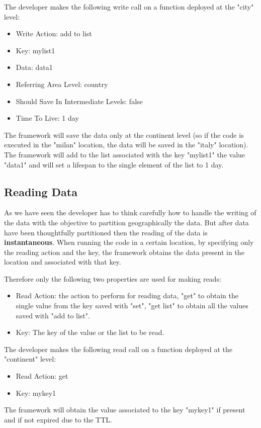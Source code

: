 \begin{example}
The developer makes the following write call on a function deployed at the "city" level:
\begin{itemize}
    \item Write Action: add to list
    \item Key: mylist1
    \item Data: data1
    \item Referring Area Level: country
    \item Should Save In Intermediate Levels: false
    \item Time To Live: 1 day
\end{itemize}
The framework will save the data only at the continent level (so if the code is executed in the "milan" location, the data will be saved in the "italy" location). The framework will add to the list associated with the key "mylist1" the value "data1" and will set a lifespan to the single element of the list to 1 day.
\end{example}


\subsection{Reading Data}
As we have seen the developer has to think carefully how to handle the writing of the data with the objective to partition geographically the data. But after data have been thoughtfully partitioned then the reading of the data is \textbf{instantaneous}.
When running the code in a certain location, by specifying only the reading action and the key, the framework obtains the data present in the location and associated with that key.

Therefore only the following two properties are used for making reads:
\begin{itemize}
    \item Read Action: the action to perform for reading data, "get" to obtain the single value from the key saved with "set", "get list" to obtain all the values saved with "add to list".
    \item Key: The key of the value or the list to be read.
\end{itemize}

\begin{example}
The developer makes the following read call on a function deployed at the "continent" level:
\begin{itemize}
    \item Read Action: get
    \item Key: mykey1
\end{itemize}
The framework will obtain the value associated to the key "mykey1" if present and if not expired due to the TTL.
\end{example}

